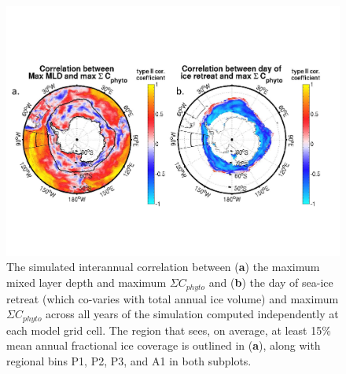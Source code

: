 \begin{figure}[!htbp]
\begin{adjustwidth}{-1in}{-1in}
 \centering
 \includegraphics[scale=.18]{figures/Ch2/Figure_9.jpg}
\end{adjustwidth}
\caption[Simulated bio-physical correlations]{The simulated interannual correlation between (\textbf{a}) the maximum mixed layer depth and maximum $\Sigma C_{phyto}$ and (\textbf{b}) the day of sea-ice retreat (which co-varies with total annual ice volume) and maximum  $\Sigma C_{phyto}$ across all years of the simulation computed independently at each model grid cell. The region that sees, on average, at least 15\% mean annual fractional ice coverage is outlined in (\textbf{a}), along with regional bins P1, P2, P3, and A1 in both subplots.}
\label{fig:Fig9}
\end{figure}